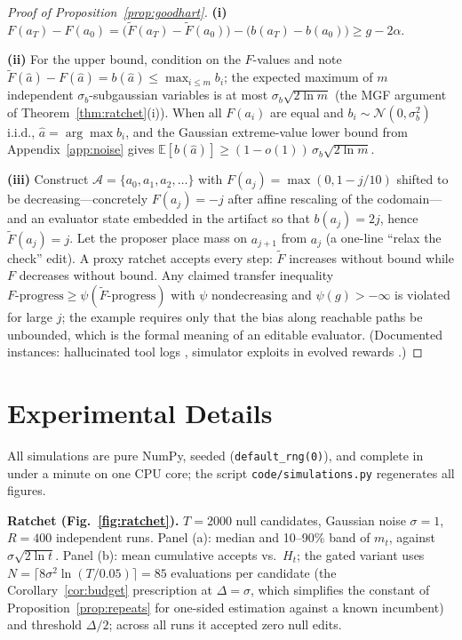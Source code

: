 \documentclass{article}
\theoremstyle{plain}
\theoremstyle{definition}
\theoremstyle{remark}
\newcommand{\A}{\mathcal{A}}
\newcommand{\E}{\mathbb{E}}
\newcommand{\Ftil}{\widetilde{F}}
\begin{document}
\begin{proof}[Proof of Proposition~\ref{prop:goodhart}]
\textbf{(i)} $F(a_T) - F(a_0) = \big(\Ftil(a_T) - \Ftil(a_0)\big) - \big(b(a_T) - b(a_0)\big) \ge g - 2\alpha$.

\textbf{(ii)} For the upper bound, condition on the $F$-values and note $\Ftil(\hat a) - F(\hat a) = b(\hat a) \le \max_{i \le m} b_i$; the expected maximum of $m$ independent $\sigma_b$-subgaussian variables is at most $\sigma_b\sqrt{2\ln m}$ (the MGF argument of Theorem~\ref{thm:ratchet}(i)). When all $F(a_i)$ are equal and $b_i \sim \mathcal{N}(0, \sigma_b^2)$ i.i.d., $\hat a = \arg\max b_i$, and the Gaussian extreme-value lower bound from Appendix~\ref{app:noise} gives $\E[b(\hat a)] \ge (1-o(1))\,\sigma_b\sqrt{2 \ln m}$.

\textbf{(iii)} Construct $\A = \{a_0, a_1, a_2, \dots\}$ with $F(a_j) = \max(0, 1 - j/10)$ shifted to be decreasing---concretely $F(a_j) = -j$ after affine rescaling of the codomain---and an evaluator state embedded in the artifact so that $b(a_j) = 2j$, hence $\Ftil(a_j) = j$. Let the proposer place mass on $a_{j+1}$ from $a_j$ (a one-line ``relax the check'' edit). A proxy ratchet accepts every step: $\Ftil$ increases without bound while $F$ decreases without bound. Any claimed transfer inequality $F\text{-progress} \ge \psi(\Ftil\text{-progress})$ with $\psi$ nondecreasing and $\psi(g) > -\infty$ is violated for large $j$; the example requires only that the bias along reachable paths be unbounded, which is the formal meaning of an editable evaluator. (Documented instances: hallucinated tool logs \cite{zhang2025dgm}, simulator exploits in evolved rewards \cite{ma2024eureka}.)
\end{proof}

\section{Experimental Details}
\label{app:exp}

All simulations are pure NumPy, seeded (\texttt{default\_rng(0)}), and complete in under a minute on one CPU core; the script \texttt{code/simulations.py} regenerates all figures.

\textbf{Ratchet (Fig.~\ref{fig:ratchet}).} $T = 2000$ null candidates, Gaussian noise $\sigma = 1$, $R = 400$ independent runs. Panel (a): median and 10--90\% band of $m_t$, against $\sigma\sqrt{2\ln t}$. Panel (b): mean cumulative accepts vs.\ $H_t$; the gated variant uses $N = \lceil 8\sigma^2 \ln(T/0.05) \rceil = 85$ evaluations per candidate (the Corollary~\ref{cor:budget} prescription at $\Delta = \sigma$, which simplifies the constant of Proposition~\ref{prop:repeats} for one-sided estimation against a known incumbent) and threshold $\Delta/2$; across all runs it accepted zero null edits.
\end{document}
